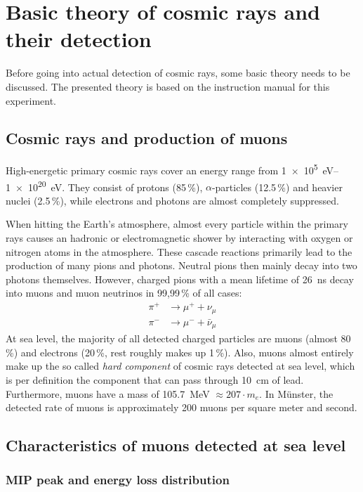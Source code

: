 \section{Basic theory of cosmic rays and their detection}
	
Before going into actual detection of cosmic rays, some basic theory needs to be discussed.
The presented theory is based on the instruction manual for this experiment\cite{wwu}.
	

\subsection{Cosmic rays and production of muons}

High-energetic primary cosmic rays cover an energy range from \SIrange{1e5}{1e20}{\electronvolt}.
They consist of protons (85\,\%), $\alpha$-particles (12.5\,\%) and heavier nuclei (2.5\,\%), while electrons and photons are almost completely suppressed.

When hitting the Earth's atmosphere, almost every particle within the primary rays causes an hadronic or electromagnetic shower by interacting with oxygen or nitrogen atoms in the atmosphere.
These cascade reactions primarily lead to the production of many pions and photons.
Neutral pions then mainly decay into two photons themselves.
However, charged pions with a mean lifetime of \SI{26}{\nano\second} \cite{pdg} decay into muons and muon neutrinos in 99,99\,\% of all cases:
\begin{align}
	\pi^+&\longrightarrow \mu^++\nu_\mu\\
	\pi^-&\longrightarrow \mu^-+\bar{\nu}_\mu
\end{align}
At sea level, the majority of all detected charged particles are muons (almost 80\,\%) and electrons (20\,\%, rest roughly makes up 1\,\%).
Also, muons almost entirely make up the so called \emph{hard component} of cosmic rays detected at sea level, which is per definition the component that can pass through \SI{10}{\centi\meter} of lead.
Furthermore, muons have a mass of \SI{105.7}{\mega\electronvolt} $\approx 207 \cdot m_e$.
In Münster, the detected rate of muons is approximately 200 muons per square meter and second.

\subsection{Characteristics of muons detected at sea level}

\subsubsection{MIP peak and energy loss distribution} \label{PeakEnergyLossDistribution}

